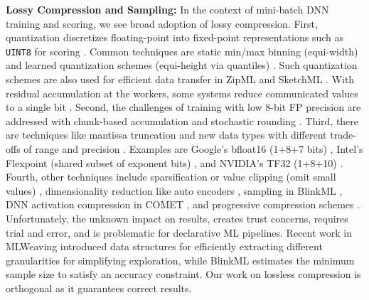 \textbf{Lossy Compression and Sampling:} In the context of mini-batch DNN training and scoring, we see broad adoption of lossy compression. First, quantization discretizes floating-point into fixed-point representations such as \texttt{UINT8} for scoring \cite{tfmopt2}. Common techniques are static min/max binning (equi-width) \cite{tfmopt2} and learned quantization schemes (equi-height via quantiles) \cite{Zhang0KALZ17,ZhuHMD17}. Such quantization schemes are also used for efficient data transfer in ZipML \cite{Zhang0KALZ17} and SketchML \cite{JiangFY018}. With residual accumulation at the workers, some systems reduce communicated values to a single bit \cite{SeideFDLY14}. Second, the challenges of training with low 8-bit FP precision are addressed with chunk-based accumulation and stochastic rounding \cite{WangCBCG18}. Third, there are techniques like mantissa truncation \cite{AbadiBCCDDDGIIK16,BhattacherjeeDS14} and new data types with different trade-offs of range and precision \cite{A100}. Examples are Google's bfloat16 (1+8+7 bits) \cite{Saeta18}, Intel's Flexpoint (shared subset of exponent bits) \cite{KosterWWNBCEHHK17}, and NVIDIA's TF32 (1+8+10) \cite{A100}. Fourth, other techniques include sparsification or value clipping (omit small values) \cite{tfmopt1,A100}, dimensionality reduction like auto encoders \cite{IlkhechiCGMFSC20}, sampling in BlinkML \cite{ParkQSM19}, DNN activation compression in COMET \cite{JinZJFGLST2022}, and progressive compression schemes \cite{WangKZAZM19, KuchnikAS21}. Unfortunately, the unknown impact on results, creates trust concerns, requires trial and error, and is problematic for declarative ML pipelines. Recent work in MLWeaving \cite{WangKZAZM19} introduced data structures for efficiently extracting different granularities for simplifying exploration, while BlinkML \cite{ParkQSM19} estimates the minimum sample size to satisfy an accuracy constraint. Our work on lossless compression is orthogonal as it guarantees correct results.

